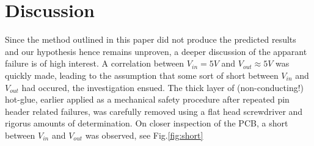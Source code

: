 \section{Discussion}
Since the method outlined in this paper did not produce the predicted results and our hypothesis hence remains unproven, a deeper discussion of the apparant failure is of high interest. A correlation between $V_{in} = 5V$ and $V_{out} \approx 5V$ was quickly made, leading to the assumption that some sort of short between $V_{in}$ and $V_{out}$ had occured, the investigation ensued. The thick layer of (non-conducting!) hot-glue, earlier applied as a mechanical safety procedure after repeated pin header related failures, was carefully removed using a flat head screwdriver and rigorus amounts of determination. On closer inspection of the PCB, a short between $V_{in}$ and $V_{out}$ was observed, see Fig.\ref{fig:short}

